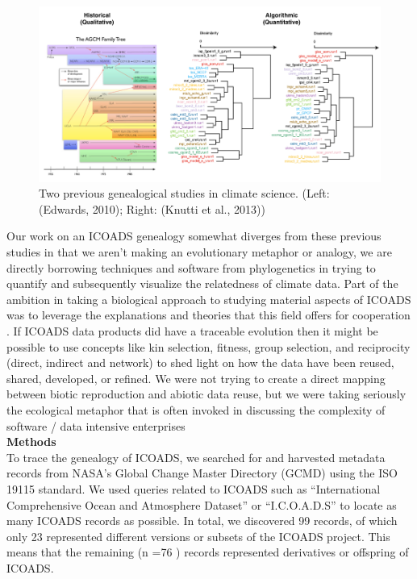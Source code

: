 \documentclass[thesis,tocnosub,noragright,centerchapter,12pt]{uiucecethesis09}
\begin{document}
\begin{figure}
\centering
\includegraphics[width=\textwidth]{Model}
\caption{Two previous genealogical studies in climate science. (Left: (Edwards, 2010); Right: (Knutti et al., 2013))}
\label{fig:LABEL2}
\end{figure}

Our work on an ICOADS genealogy somewhat diverges from these previous studies in that
we aren't making an evolutionary metaphor or analogy, we are directly
borrowing techniques and software from phylogenetics \citep{page2009molecular} in trying to
quantify and subsequently visualize the relatedness of climate data.
Part of the ambition in taking a biological approach to studying
material aspects of ICOADS was to leverage the explanations and theories
that this field offers for cooperation \citep{nowak2006five}. If ICOADS data
products did have a traceable evolution then it might be possible to use
concepts like kin selection, fitness, group selection, and reciprocity
(direct, indirect and network) to shed light on how the data have been
reused, shared, developed, or refined. We
were not trying to create a direct mapping between biotic
reproduction and abiotic data reuse, but we were taking seriously the
ecological metaphor that is often invoked in discussing the complexity
of software / data intensive enterprises \citep{weber2013niche}\\

\textbf{Methods} \\
To trace the genealogy of ICOADS, we searched for and
harvested metadata records from NASA's Global Change Master Directory
(GCMD) using the ISO 19115 standard. We used queries related to ICOADS
such as ``International Comprehensive Ocean and Atmosphere Dataset'' or
``I.C.O.A.D.S'' to locate as many ICOADS records as possible. In total,
we discovered 99 records, of which only 23 represented different
versions or subsets of the ICOADS project. This means that the remaining
(n =76 ) records represented derivatives or offspring of ICOADS.\\
\end{document}

